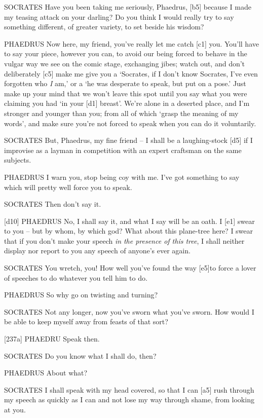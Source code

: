 SOCRATES Have you been taking me seriously, Phaedrus, {[}b5{]} because I
made my teasing attack on your darling? Do you think I would really try
to say something different, of greater variety, to set beside his
wisdom?

PHAEDRUS Now here, my friend, you've really let me catch {[}c1{]} you.
You'll have to say your piece, however you can, to avoid our being
forced to behave in the vulgar way we see on the comic stage, exchanging
jibes; watch out, and don't deliberately {[}c5{]} make me give you a
‘Socrates, if I don't know Socrates, I've even forgotten who {\em I}
am,' or a ‘he was desperate to speak, but put on a pose.' Just make up
your mind that we won't leave this spot until you say what you were
claiming you had ‘in your {[}d1{]} breast'. We're alone in a deserted
place, and I'm stronger and younger than you; from all of which ‘grasp
the meaning of my words',
and make sure you're not forced to speak when you can do it voluntarily.

SOCRATES But, Phaedrus, my fine friend -- I shall be a laughing-stock
{[}d5{]} if I improvise as a layman in competition with an expert
craftsman on the same
subjects.

PHAEDRUS I warn you, stop being coy with me. I've got something to say
which will pretty well force you to speak.

SOCRATES Then don't say it.

{[}d10{]} PHAEDRUS No, I shall say it, and what I say will be an oath. I
{[}e1{]} swear to you -- but by whom, by which god? What about this
plane-tree here? I swear that if you don't make your speech {\em in}
{\em the presence of this tree}, I shall neither display nor report to
you any speech of anyone's ever again.

SOCRATES You wretch, you! How well you've found the way {[}e5{]}to force
a lover of speeches to do whatever you tell him to do.

PHAEDRUS So why go on twisting and turning?

SOCRATES Not any longer, now you've sworn what you've sworn. How would I
be able to keep myself away from feasts of that sort?

{[}237a{]} PHAEDRU Speak then.

SOCRATES Do you know what I shall do, then?

PHAEDRUS About what?

SOCRATES I shall speak with my head covered, so that I can {[}a5{]} rush
through my speech as quickly as I can and not lose my way through shame,
from looking at you.

